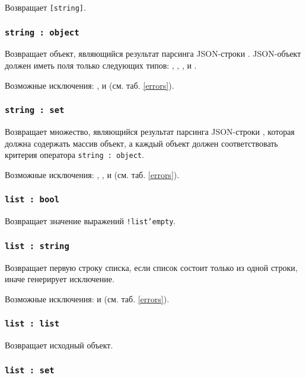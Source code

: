 Возвращает \texttt{[string]}.

\subsubsection{\texttt{string : object}}

Возвращает объект, являющийся результат парсинга JSON-строки \str. JSON-объект должен иметь поля только следующих типов: \bool, \integer, \double, \str{} и \listtype.

Возможные исключения: ,  и  (см. таб. \ref{errors}).

\subsubsection{\texttt{string : set}}

Возвращает множество, являющийся результат парсинга JSON-строки \str, которая должна содержать массив объект, а каждый объект должен соответствовать критерия оператора \texttt{string : object}.

Возможные исключения: , ,  и  (см. таб. \ref{errors}).

\subsubsection{\texttt{list : bool}}

Возвращает значение выражений \texttt{!list'empty}.

\subsubsection{\texttt{list : string}}

Возвращает первую строку списка, если список состоит только из одной строки, иначе генерирует исключение.

Возможные исключения:  и  (см. таб. \ref{errors}).

\subsubsection{\texttt{list : list}}

Возвращает исходный объект.

\subsubsection{\texttt{list : set}}

